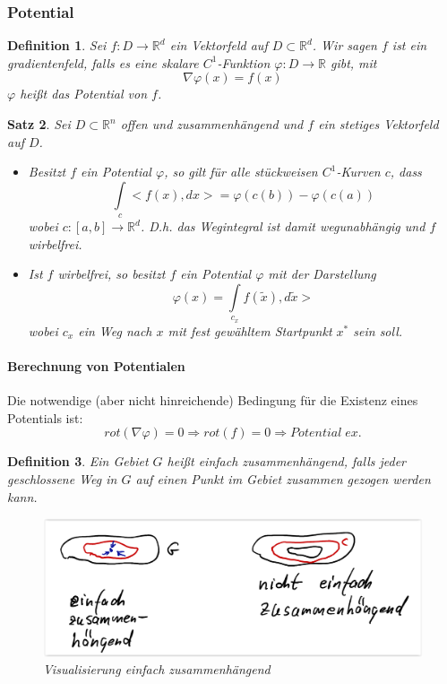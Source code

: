 \documentclass[12pt,a4paper]{article}%
\newtheorem{satz}{Satz}[section]
\newtheorem{definition}[satz]{Definition}
\numberwithin{equation}{section}
\newcommand{\R}{\mathbb{R}} %
\newcommand{\subsubsubsection}{\paragraph}
\numberwithin{equation}{subsection}
\begin{document}
		\subsubsection{Potential}
	  \begin{definition}
	    Sei $f:D\rightarrow \R^d$ ein Vektorfeld auf $D\subset \R^d$. Wir sagen $f$ ist ein gradientenfeld, falls es eine skalare $C^1$-Funktion $\varphi: D\rightarrow\R$ gibt, mit 
	    \begin{equation}
	    \nabla \varphi(x) = f(x)
	    \end{equation}
	    $\varphi$ heißt das Potential von $f$.
	  \end{definition}
    \begin{satz}
      Sei $D \subset \R^n$ offen und zusammenhängend und $f$ ein stetiges Vektorfeld auf $D$. 
      \begin{itemize}
        \item[a) ] Besitzt $f$ ein Potential $\varphi$, so gilt für alle stückweisen $C^1$-Kurven $c$, dass 
        \begin{equation}
          \int\limits_c <f(x),dx> = \varphi(c(b)) - \varphi(c(a))
        \end{equation}
        wobei $c:[a,b]\rightarrow \R^d$. D.h. das Wegintegral ist damit wegunabhängig und $f$ wirbelfrei.
        \item[b) ] Ist $f$ wirbelfrei, so besitzt $f$ ein Potential $\varphi$ mit der Darstellung 
        \begin{equation}
          \varphi(x) = \int\limits_{c_x} f(\tilde{x}),d\tilde{x}>
        \end{equation}
        wobei $c_x$ ein Weg nach $x$ mit fest gewähltem Startpunkt $x^*$ sein soll.
      \end{itemize}
    \end{satz}	  
	  \subsubsubsection{Berechnung von Potentialen}
	  Die notwendige (aber nicht hinreichende) Bedingung für die Existenz eines Potentials ist:
	  \begin{equation}
	    rot(\nabla \varphi) = 0 \Rightarrow rot(f) = 0 \Rightarrow Potential\;ex.  
	  \end{equation}
	  \begin{definition}
	    Ein Gebiet $G$ heißt einfach zusammenhängend, falls jeder geschlossene Weg in $G$ auf einen Punkt im Gebiet zusammen gezogen werden kann.
	    \begin{figure}[H] 
			  \centering
			  \includegraphics[width=0.8\linewidth]{einfach_zusammenhaengend.png}
			  \caption{Visualisierung einfach zusammenhängend \protect\cite{HM12}}
			  \label{fig:einfach_zusammenhängend}
		  \end{figure}
	  \end{definition}
	  
  \newpage

\end{document}
